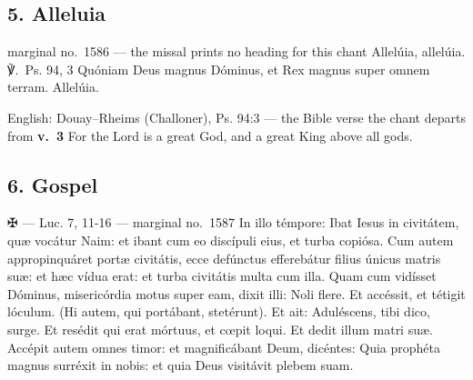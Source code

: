 \subsection*{5. Alleluia }

\begin{appointedlatin}{marginal no.\ 1586 --- the missal prints no heading for this chant}
Allelúia, allelúia. ℣.~\textnormal{Ps. 94, 3} Quóniam Deus magnus Dóminus, et
Rex magnus super omnem terram. Allelúia.
\end{appointedlatin}

\begin{namedtranslation}{English: Douay--Rheims (Challoner), Ps. 94:3 --- the Bible verse the chant departs from}
\textbf{v.~3} For the Lord is a great God, and a great King above all gods.
\end{namedtranslation}


\elementguard
\subsection*{6. Gospel }

\begin{appointedlatin}{✠  --- Luc. 7, 11-16 --- marginal no.\ 1587}
In illo témpore: Ibat Iesus in civitátem, quæ vocátur Naim: et ibant cum eo
discípuli eius, et turba copiósa. Cum autem appropinquáret portæ civitátis, ecce
defúnctus efferebátur filius únicus matris suæ: et hæc vídua erat: et turba
civitátis multa cum illa. Quam cum vidísset Dóminus, misericórdia motus super
eam, dixit illi: Noli flere. Et accéssit, et tétigit lóculum. (Hi autem, qui
portábant, stetérunt). Et ait: Aduléscens, tibi dico, surge. Et resédit qui erat
mórtuus, et cœpit loqui. Et dedit illum matri suæ. Accépit autem omnes timor: et
magnificábant Deum, dicéntes: Quia prophéta magnus surréxit in nobis: et quia
Deus visitávit plebem suam.
\end{appointedlatin}

